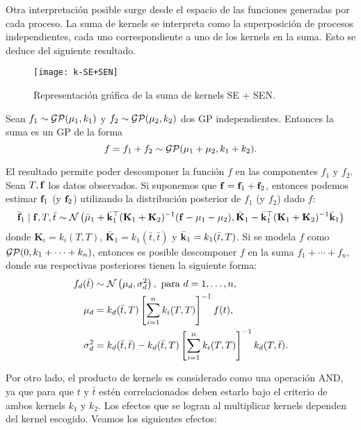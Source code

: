 Otra interpretación posible surge desde el espacio de las funciones generadas por cada proceso. La suma de kernels se interpreta como la superposición de procesos independientes, cada uno correspondiente a uno de los kernels en la suma. Esto se deduce del siguiente resultado.
\begin{figure}[h]
	\centering
	\texttt{[image: k-SE+SEN]}
	\caption{Representación gráfica de la suma de kernels SE + SEN.}
\end{figure}

\begin{proposition}
	Sean \(f_{1} \sim \operatorname{\mathcal{GP}}(\mu_{1}, k_{1})\) y \(f_{2} \sim \operatorname{\mathcal{GP}}(\mu_{2}, k_{2})\) dos GP independientes. Entonces la suma es un GP de la forma
	\begin{equation*}
		f = f_{1} + f_{2} \sim \operatorname{\mathcal{GP}}(\mu_{1} + \mu_{2}, k_{1} + k_{2}).
	\end{equation*}
\end{proposition}

El resultado permite poder descomponer la función \(f\) en las componentes \(f_{1}\) y \(f_{2}\). Sean \(T, \mathbf{f}\) los datos observados. Si suponemos que \(\mathbf{f} = \mathbf{f}_{1} + \mathbf{f}_{2}\), entonces podemos estimar \(\mathbf{f}_{1}\) (y \(\mathbf{f}_{2}\)) utilizando la distribución posterior de \(f_{1}\) (y \(f_{2}\)) dado \(f\):
\begin{equation*}
	\bar{\mathbf{f}}_{1} \mid \mathbf{f}, T, \bar{t} \sim \mathcal{N}\left(\bar{\mu}_{1} + \bar{\mathbf{k}}_{1}^{\top} (\mathbf{K}_{1} + \mathbf{K}_{2})^{-1} (\mathbf{f} - \mu_{1} - \mu_{2}), \bar{\mathbf{K}}_{1} - \bar{\mathbf{k}}_{1}^{\top} (\mathbf{K}_{1}
	+ \mathbf{K}_{2})^{-1} \bar{\mathbf{k}}_{1}\right)
\end{equation*}
donde \(\mathbf{K}_{i} = k_{i}(T, T)\), \(\bar{\mathbf{K}}_{1} = k_{1}(\bar{t}, \bar{t})\) y \(\bar{\mathbf{k}}_{1} = k_{1}(\bar{t}, T)\). Si se modela \(f\) como \(\operatorname{\mathcal{GP}}(0, k_{1} + \dotsb + k_{n})\), entonces es posible descomponer \(f\) en la suma \(f_{1} + \dotsb + f_{n}\), donde sus respectivas posteriores tienen la siguiente forma:
\begin{align*}
	f_{d}(\bar{t})	&\sim \mathcal{N}\left(\mu_{d}, \sigma_{d}^{2}\right), \text{ para } d=1, \dotsc, n,\\
	\mu_{d}			&= k_{d}(\bar{t}, T) \left[ \sum_{i=1}^{n} k_{i}(T, T) \right]^{-1} f(t), \\
	\sigma_{d}^{2}	&= k_{d}(\bar{t}, \bar{t}) - k_{d}(\bar{t}, T) \left[ \sum_{i=1}^{n} k_{i}(T, T) \right]^{-1} k_{d}(T, \bar{t}).
\end{align*}

Por otro lado, el producto de kernels es considerado como una operación \textsc{AND}, ya que para que \(t\) y \(\bar{t}\) estén correlacionados deben estarlo bajo el criterio de ambos kernels \(k_{1}\) y \(k_{2}\). Los efectos que se logran al multiplicar kernels dependen del kernel escogido. Veamos los siguientes efectos:

